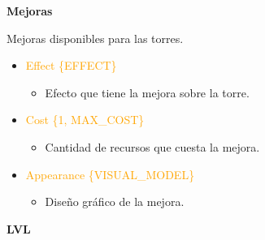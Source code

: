 \documentclass{article}
\begin{document}
\noindent \textbf{Mejoras}

\hfill \break \noindent Mejoras disponibles para las torres.

\begin{itemize}
    \item \textcolor{Orange}{Effect \{EFFECT\}}
    \begin{itemize}
        \item Efecto que tiene la mejora sobre la torre.
    \end{itemize}
    \item \textcolor{Orange}{Cost \{1, MAX\_COST\}}
    \begin{itemize}
        \item Cantidad de recursos que cuesta la mejora.
    \end{itemize}
     \item \textcolor{Orange}{Appearance \{VISUAL\_MODEL\}}
    \begin{itemize}
        \item Diseño gráfico de la mejora.
    \end{itemize}
\end{itemize}

\noindent \textbf{LVL}
\end{document}
